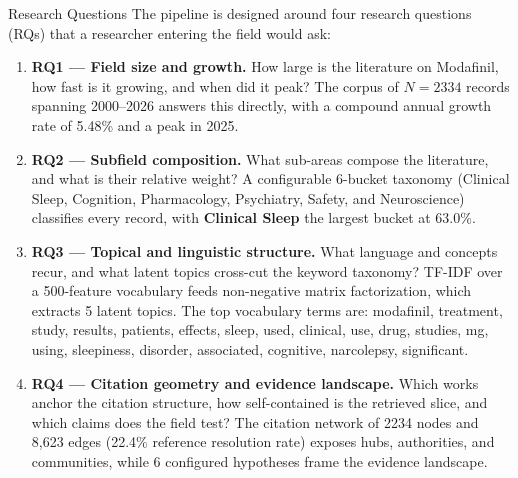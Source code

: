 \documentclass[
  ignorenonframetext,
]{beamer}
\begin{document}
\begin{frame}[allowframebreaks]{Research Questions}
\protect{}\label{research-questions}
The pipeline is designed around four research questions (RQs) that a
researcher entering the field would ask:

\begin{enumerate}
\item
  \textbf{RQ1 --- Field size and growth.} How large is the literature on
  Modafinil, how fast is it growing, and when did it peak? The corpus of
  \(N = 2334\) records spanning 2000--2026 answers this directly, with a
  compound annual growth rate of 5.48\% and a peak in 2025.
\item
  \textbf{RQ2 --- Subfield composition.} What sub-areas compose the
  literature, and what is their relative weight? A configurable 6-bucket
  taxonomy (Clinical Sleep, Cognition, Pharmacology, Psychiatry, Safety,
  and Neuroscience) classifies every record, with \textbf{Clinical
  Sleep} the largest bucket at 63.0\%.
\item
  \textbf{RQ3 --- Topical and linguistic structure.} What language and
  concepts recur, and what latent topics cross-cut the keyword taxonomy?
  TF-IDF over a 500-feature vocabulary feeds non-negative matrix
  factorization, which extracts 5 latent topics. The top vocabulary
  terms are: modafinil, treatment, study, results, patients, effects,
  sleep, used, clinical, use, drug, studies, mg, using, sleepiness,
  disorder, associated, cognitive, narcolepsy, significant.
\item
  \textbf{RQ4 --- Citation geometry and evidence landscape.} Which works
  anchor the citation structure, how self-contained is the retrieved
  slice, and which claims does the field test? The citation network of
  2234 nodes and 8,623 edges (22.4\% reference resolution rate) exposes
  hubs, authorities, and communities, while 6 configured hypotheses
  frame the evidence landscape.
\end{enumerate}
\end{frame}
\end{document}
